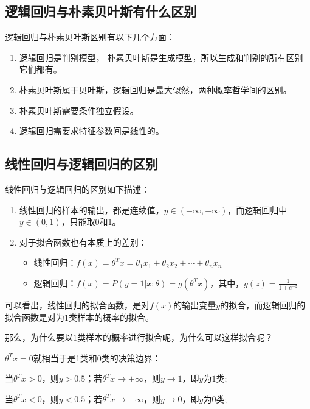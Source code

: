 \subsection{逻辑回归与朴素贝叶斯有什么区别}

逻辑回归与朴素贝叶斯区别有以下几个方面：

\begin{enumerate}
			\itemsep0em
\item 逻辑回归是判别模型， 朴素贝叶斯是生成模型，所以生成和判别的所有区别它们都有。
\item 朴素贝叶斯属于贝叶斯，逻辑回归是最大似然，两种概率哲学间的区别。
\item 朴素贝叶斯需要条件独立假设。
\item 逻辑回归需要求特征参数间是线性的。
\end{enumerate}


\subsection{线性回归与逻辑回归的区别}

线性回归与逻辑回归的区别如下描述：

\begin{enumerate}
			\itemsep0em
\item 线性回归的样本的输出，都是连续值，$ y\in (-\infty ,+\infty )$，而逻辑回归中$y\in (0,1)$，只能取0和1。
\item 对于拟合函数也有本质上的差别：
	\begin{itemize}
			\itemsep0em
		\item 线性回归：$f(x)=\theta ^{T}x=\theta _{1}x _{1}+\theta _{2}x _{2}+\cdots+\theta _{n}x _{n}$
		\item 逻辑回归：$f(x)=P(y=1|x;\theta )=g(\theta ^{T}x)$，其中，$g(z)=\frac{1}{1+e^{-z}}$
	\end{itemize}
\end{enumerate}

可以看出，线性回归的拟合函数，是对$f(x)$的输出变量$y$的拟合，而逻辑回归的拟合函数是对为$1$类样本的概率的拟合。

那么，为什么要以$1$类样本的概率进行拟合呢，为什么可以这样拟合呢？

$\theta ^{T}x=0$就相当于是1类和0类的决策边界：

当$\theta ^{T}x>0$，则$y>0.5$；若$\theta ^{T}x\rightarrow +\infty $，则$y \rightarrow  1 $，即$y$为$1$类;

当$\theta ^{T}x<0$，则$y<0.5$；若$\theta ^{T}x\rightarrow -\infty $，则$y \rightarrow  0 $，即$y$为$0$类;

